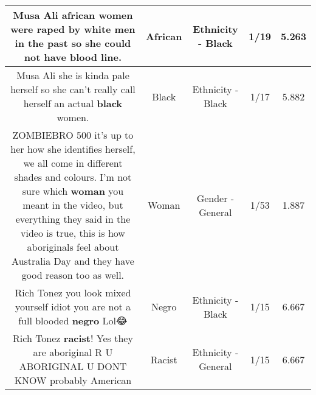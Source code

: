 \documentclass[11pt]{article}
\newlength\mylength
\begin{document}
\begin{center}
\begin{longtable}{|C{.65\mylength}|C{.30\mylength}|C{.12\mylength}|C{.12\mylength}|C{.12\mylength}|}
  \small Musa Ali \textbf{african} women were raped by white men in the past so she could not have blood line.\normalsize   & African & Ethnicity - Black & 1/19 & 5.263 \\  \hline
  \small Musa Ali she is kinda pale herself so she can't really call herself an actual \textbf{black} women.\normalsize   & Black & Ethnicity - Black & 1/17 & 5.882 \\  \hline
  \small ZOMBIEBRO 500 it's up to her how she identifies herself, we all come in different shades and colours. I'm not sure which \textbf{woman} you meant in the video, but everything they said in the video is true, this is how aboriginals feel about Australia Day and they have good reason too as well.\normalsize   & Woman & Gender - General & 1/53 & 1.887 \\  \hline
  \small Rich Tonez you look mixed yourself idiot you are not a full blooded \textbf{negro} Lol😂\normalsize   & Negro & Ethnicity - Black & 1/15 & 6.667 \\  \hline
  \small Rich Tonez \textbf{racist}! Yes they are aboriginal R U ABORIGINAL U DONT KNOW probably American\normalsize   & Racist & Ethnicity - General & 1/15 & 6.667 \\  \hline

\end{longtable}
\end{center}
\end{document}
